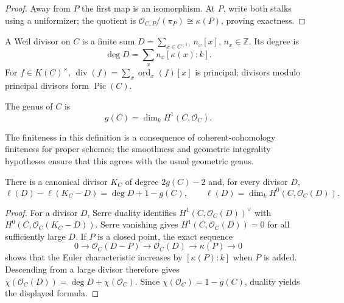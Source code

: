 \begin{proof}
  Away from \(P\) the first map is an isomorphism.  At \(P\), write both
  stalks using a uniformizer; the quotient is
  \(\mathcal O_{C,P}/(\pi_P)\cong\kappa(P)\), proving exactness.
\end{proof}

\begin{definition}[Divisors]
  \label{mk-def-divisor}
  \cite{hartshorne-ag,papaioannou-rr}
  A Weil divisor on \(C\) is a finite sum \(D=\sum_{x\in C^{(1)}}n_x[x]\),
  \(n_x\in\mathbb Z\).  Its degree is
  \[
    \deg D=\sum_x n_x[\kappa(x):k].
  \]
  For \(f\in K(C)^\times\), \(\operatorname{div}(f)=\sum_x
  \operatorname{ord}_x(f)[x]\) is principal; divisors modulo principal
  divisors form \(\operatorname{Pic}(C)\).
\end{definition}

\begin{definition}[Genus]
  \label{mk-def-genus}
  \cite{milne-av,kleiman-picard}
  The genus of \(C\) is
  \[
    g(C)=\dim_k H^1(C,\mathcal O_C).
  \]
\end{definition}

The finiteness in this definition is a consequence of coherent-cohomology
finiteness for proper schemes; the smoothness and geometric integrality
hypotheses ensure that this agrees with the usual geometric genus.

\begin{theorem}
  \label{mk-thm-riemann-roch}
  \cite{hartshorne-ag,papaioannou-rr}
  There is a canonical divisor \(K_C\) of degree \(2g(C)-2\) and, for every
  divisor \(D\),
  \[
    \ell(D)-\ell(K_C-D)=\deg D+1-g(C),
    \qquad \ell(D)=\dim_k H^0(C,\mathcal O_C(D)).
  \]
\end{theorem}

\begin{proof}
  For a divisor \(D\), Serre duality identifies
  \(H^1(C,\mathcal O_C(D))^\vee\) with
  \(H^0(C,\mathcal O_C(K_C-D))\).  Serre vanishing gives
  \(H^1(C,\mathcal O_C(D))=0\) for all sufficiently large \(D\).  If \(P\) is
  a closed point, the exact sequence
  \[
    0\longrightarrow\mathcal O_C(D-P)\longrightarrow\mathcal O_C(D)
    \longrightarrow\kappa(P)\longrightarrow0
  \]
  shows that the Euler characteristic increases by \([\kappa(P):k]\) when
  \(P\) is added.  Descending from a large divisor therefore gives
  \(\chi(\mathcal O_C(D))=\deg D+\chi(\mathcal O_C)\).  Since
  \(\chi(\mathcal O_C)=1-g(C)\), duality yields the displayed formula.
\end{proof}


